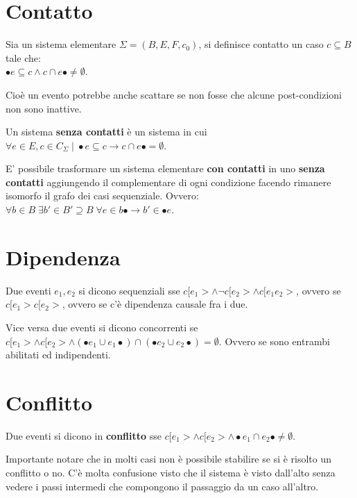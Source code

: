 \section{Contatto}

Sia un sistema elementare $\Sigma = (B, E, F, c_0)$, si definisce contatto un caso $c \subseteq B$ tale che: \\
$\bullet e \subseteq c \land c \cap e \bullet \neq \emptyset$.

Cio\`e un evento potrebbe anche scattare se non fosse che alcune post-condizioni non sono inattive.

Un sistema \textbf{senza contatti} \`e un sistema in cui $\forall e \in E, c \in C_\Sigma \; | \; \bullet e \subseteq c \rightarrow c \cap e \bullet = \emptyset$.

E' possibile trasformare un sistema elementare \textbf{con contatti} in uno \textbf{senza contatti} aggiungendo il complementare di ogni condizione facendo rimanere isomorfo il grafo dei casi sequenziale.
Ovvero: $\forall b \in B\; \exists b' \in B' \supseteq B \; \forall e \in b \bullet \rightarrow b' \in \bullet e$.


\section{Dipendenza}

Due eventi $e_1,e_2$ si dicono sequenziali sse $c[e_1> \land \neg c[e_2> \land c[e_1e_2 >$, ovvero se $c[e_1 > c[e_2 >$, ovvero se c'\`e dipendenza causale fra i due.

Vice versa due eventi si dicono concorrenti se $c[e_1> \land c[e_2> \land (\bullet e_1 \cup e_1 \bullet) \cap (\bullet e_2 \cup e_2 \bullet) = \emptyset$.
Ovvero se sono entrambi abilitati ed indipendenti.

\section{Conflitto}

Due eventi si dicono in \textbf{conflitto} sse $c[e_1> \land c[e_2> \land \bullet e_1 \cap e_2 \bullet \neq \emptyset$.

Importante notare che in molti casi non \`e possibile stabilire se si \`e risolto un conflitto o no. C'\`e molta confusione visto che il sistema \`e visto dall'alto senza vedere i passi intermedi che compongono il passaggio da un caso all'altro.

